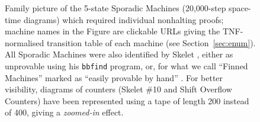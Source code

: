 \begin{figure}[h!]

    \caption{{\small Family picture of the 5-state Sporadic Machines (20,000-step space-time diagrams) which required individual \Coq nonhalting proofs; machine names in the Figure are clickable URLs giving the TNF-normalised transition table of each machine (see Section~\ref{sec:enum}). All Sporadic Machines were also identified by Skelet \cite{Skelet_bbfind}, either as unprovable using his \texttt{bbfind} program, or, for what we call ``Finned Machines'' marked as ``easily provable by hand'' \cite{Skelet_bbfind_list}. For better visibility, diagrams of counters (Skelet \#10 and Shift Overflow Counters) have been represented using a tape of length 200 instead of 400, giving a \textit{zoomed-in} effect.}}
    \label{fig:sporadic}
\end{figure}

